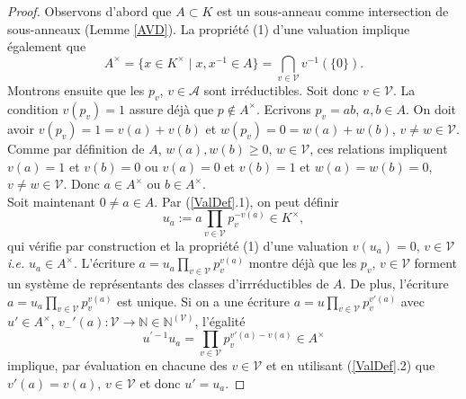 \documentclass[a4paper, 12pt]{amsart}
\newcommand{\N}{\mathbb{N}}
\begin{document}
\begin{proof}Observons d'abord que  $A\subset K$ est un sous-anneau comme intersection de sous-anneaux (Lemme \ref{AVD}). La propri\'et\'e (1) d'une valuation implique \'egalement que $$A^\times=\lbrace x\in K^\times\;|\; x,x^{-1}\in A\rbrace =\displaystyle{\bigcap_{v\in\mathcal{V}}v^{-1}(\lbrace 0\rbrace)}.$$  
\noindent Montrons ensuite que les $p_v$, $v\in\mathcal{A}$ sont irr\'eductibles.  Soit donc $v\in \mathcal{V}$. La condition $v(p_v)=1$ assure d\'ej\`a que $p\notin A^\times$. Ecrivons $p_v=ab$, $a,b\in A$. On doit avoir $v(p_v)=1=v(a)+v(b)$ et $w(p_v)=0=w(a)+w(b)$, $v\not=w\in\mathcal{V}$. Comme par d\'efinition de $A$, $w(a),w(b)\geq 0$, $w\in\mathcal{V}$, ces relations impliquent $v(a)=1$ et $v(b)=0$ ou $v(a)=0$ et $v(b)=1$ et $w(a)=w(b)=0$, $v\not=w\in\mathcal{V}$. Donc $a\in A^\times$ ou $b\in A^\times$.\\
\noindent Soit maintenant $0\not=a\in A$. Par (\ref{ValDef}.1), on peut d\'efinir  $$u_a:=a\prod_{v\in\mathcal{V}}p_v^{-v(a)}\in K^\times,$$
qui v\'erifie par construction et la propri\'et\'e (1) d'une valuation $v(u_a)=0$, $v\in\mathcal{V}$ \textit{i.e.} $u_a\in A^\times$. L'\'ecriture  $a=u_a\prod_{v\in\mathcal{V}}p_v^{v(a)}$ montre d\'ej\`a que les $p_v$, $v\in\mathcal{V}$ forment  un syst\`eme de repr\'esentants des classes d'irrr\'eductibles de $A$. De plus, l'\'ecriture $a=u_a\prod_{v\in\mathcal{V}}p_v^{v(a)}$ est unique.  Si on a une \'ecriture $a=u\prod_{v\in\mathcal{V}}p_v^{v'(a)}$
avec $u'\in A^\times$, $v_-'(a):\mathcal{V}\rightarrow \N\in\N^{(\mathcal{V})}$, l'\'egalit\'e
 $$u^{'-1} u_a=\prod_{v\in\mathcal{V}}p_v^{v'(a)-v(a)}\in A^\times$$
implique, par \'evaluation en chacune des $v\in\mathcal{V}$ et en utilisant (\ref{ValDef}.2) que $v'(a)=v(a)$, $v\in\mathcal{V}$ et donc $u'=u_a$.
\end{proof}
\end{document}
